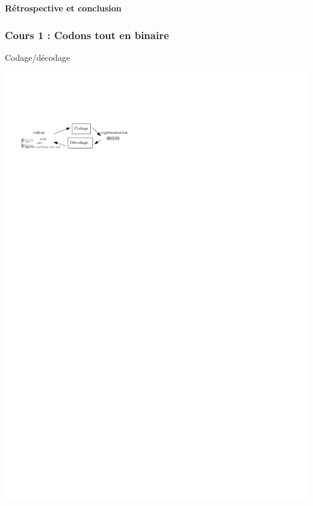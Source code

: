 \documentclass{beamer}
\begin{document}





\begin{frame}
\begin{center}
\textbf{Rétrospective et conclusion}
\end{center}
\end{frame}

\begin{frame}
\frametitle{Cours 1 : Codons tout en binaire}
\begin{block}{Codage/décodage}

\centering\includegraphics[width=\linewidth]{Figs/synthese1.pdf}

\end{block}
\end{frame}
\end{document}
